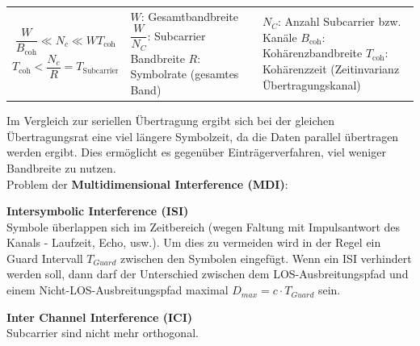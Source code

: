 \begin{tabular}{lll}
\parbox{4cm}{
$$\frac W{B_{\text{coh}}} \ll N_c \ll WT_{\text{coh}} $$ 
$$ T_{\text{coh}} < \dfrac{N_c}{R} = T_{\text{Subcarrier}} $$
       } 
&
\parbox{5cm}{
   $W$: Gesamtbandbreite \\
   $\dfrac{W}{N_C}$: Subcarrier Bandbreite \\
   $R$: Symbolrate (gesamtes Band)
}       
&
\parbox{9cm}{
   $N_C$: Anzahl Subcarrier bzw. Kanäle \\
   $B_{\text{coh}}$: Kohärenzbandbreite \\
   $T_{\text{coh}}$: Kohärenzzeit (Zeitinvarianz Übertragungskanal)
}       
\end{tabular}

Im Vergleich zur seriellen Übertragung ergibt sich bei der gleichen
Übertragungsrat eine viel längere
Symbolzeit, da die Daten parallel übertragen werden ergibt. Dies
ermöglicht es gegenüber Einträgerverfahren, viel weniger Bandbreite zu nutzen.
\\

Problem der \textbf{Multidimensional Interference (MDI)}:
\begin{liste}
    \item \textbf{Intersymbolic Interference (ISI)} \\
            Symbole überlappen sich im Zeitbereich (wegen Faltung mit Impulsantwort des Kanals - Laufzeit, Echo, usw.). 
			Um dies zu vermeiden wird in der Regel ein Guard Intervall $T_{Guard}$ zwischen den Symbolen eingefügt. 
			Wenn ein ISI verhindert werden soll, dann darf der Unterschied zwischen dem LOS-Ausbreitungspfad und einem 
			Nicht-LOS-Ausbreitungspfad maximal $D_{max} = c\cdot T_{Guard}$ sein.
    \item \textbf{Inter Channel Interference (ICI)} \\
            Subcarrier sind nicht mehr orthogonal. \\
\end{liste}


